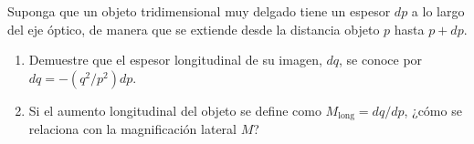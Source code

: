 \item Suponga que un objeto tridimensional muy delgado tiene un espesor $dp$ a lo largo del eje óptico, de manera que se extiende desde la distancia objeto $p$ hasta $p + dp$.
\begin{enumerate}
    \item Demuestre que el espesor longitudinal de su imagen, $dq$, se conoce por $dq = -(q^2/p^2)dp$.
    \item Si el aumento longitudinal del objeto se define como $M_{\text{long}} = dq/dp$, ¿cómo se relaciona con la magnificación lateral $M$?
\end{enumerate}